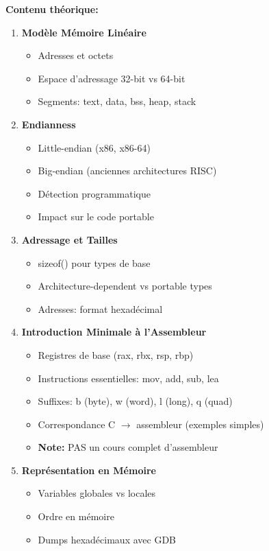 \documentclass[10pt,a4paper]{article}
\begin{document}
\textbf{Contenu théorique:}
\begin{enumerate}
\item \textbf{Modèle Mémoire Linéaire}
   \begin{itemize}
   \item Adresses et octets
   \item Espace d'adressage 32-bit vs 64-bit
   \item Segments: text, data, bss, heap, stack
   \end{itemize}

\item \textbf{Endianness}
   \begin{itemize}
   \item Little-endian (x86, x86-64)
   \item Big-endian (anciennes architectures RISC)
   \item Détection programmatique
   \item Impact sur le code portable
   \end{itemize}

\item \textbf{Adressage et Tailles}
   \begin{itemize}
   \item sizeof() pour types de base
   \item Architecture-dependent vs portable types
   \item Adresses: format hexadécimal
   \end{itemize}

\item \textbf{Introduction Minimale à l'Assembleur}
   \begin{itemize}
   \item Registres de base (rax, rbx, rsp, rbp)
   \item Instructions essentielles: mov, add, sub, lea
   \item Suffixes: b (byte), w (word), l (long), q (quad)
   \item Correspondance C $\rightarrow$ assembleur (exemples simples)
   \item \textbf{Note:} PAS un cours complet d'assembleur
   \end{itemize}

\item \textbf{Représentation en Mémoire}
   \begin{itemize}
   \item Variables globales vs locales
   \item Ordre en mémoire
   \item Dumps hexadécimaux avec GDB
   \end{itemize}
\end{enumerate}
\end{document}

